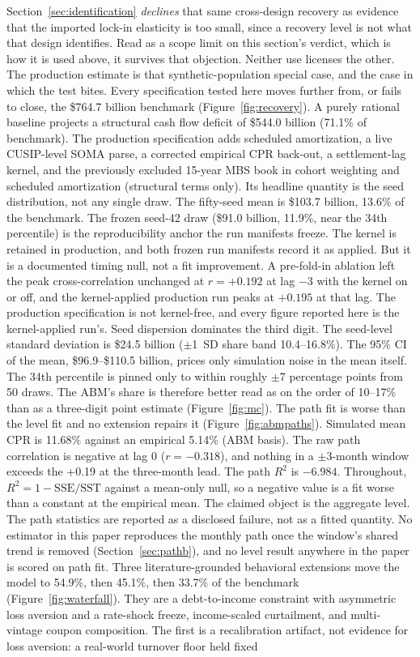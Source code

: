 \documentclass[12pt]{article}
\begin{document}
Section~\ref{sec:identification} \emph{declines} that same cross-design recovery as evidence that the imported lock-in elasticity is too small, since a recovery level is not what that design identifies. Read as a scope limit on this section's verdict, which is how it is used above, it survives that objection. Neither use licenses the other. The production estimate is that synthetic-population special case, and the case in which the test bites. Every specification tested here moves further from, or fails to close, the \$764.7 billion benchmark (Figure~\ref{fig:recovery}). A purely rational baseline projects a structural cash flow deficit of \$544.0 billion (71.1\% of benchmark). The production specification adds scheduled amortization, a live CUSIP-level SOMA parse, a corrected empirical CPR back-out, a settlement-lag kernel, and the previously excluded 15-year MBS book in cohort weighting and scheduled amortization (structural terms only). Its headline quantity is the seed distribution, not any single draw. The fifty-seed mean is \$103.7 billion, 13.6\% of the benchmark. The frozen seed-42 draw (\$91.0 billion, 11.9\%, near the 34th percentile) is the reproducibility anchor the run manifests freeze. The kernel is retained in production, and both frozen run manifests record it as applied. But it is a documented timing null, not a fit improvement. A pre-fold-in ablation left the peak cross-correlation unchanged at $r = +0.192$ at lag $-3$ with the kernel on or off, and the kernel-applied production run peaks at $+0.195$ at that lag. The production specification is not kernel-free, and every figure reported here is the kernel-applied run's. Seed dispersion dominates the third digit. The seed-level standard deviation is \$24.5 billion ($\pm$1~SD share band 10.4--16.8\%). The 95\% CI of the mean, \$96.9--\$110.5 billion, prices only simulation noise in the mean itself. The 34th percentile is pinned only to within roughly $\pm$7 percentage points from 50 draws. The ABM's share is therefore better read as on the order of 10--17\% than as a three-digit point estimate (Figure~\ref{fig:mc}). The path fit is worse than the level fit and no extension repairs it (Figure~\ref{fig:abmpaths}). Simulated mean CPR is 11.68\% against an empirical 5.14\% (ABM basis). The raw path correlation is negative at lag 0 ($r = -0.318$), and nothing in a $\pm$3-month window exceeds the +0.19 at the three-month lead. The path $R^2$ is $-6.984$. Throughout, $R^2 = 1-\mathrm{SSE}/\mathrm{SST}$ against a mean-only null, so a negative value is a fit worse than a constant at the empirical mean. The claimed object is the aggregate level. The path statistics are reported as a disclosed failure, not as a fitted quantity. No estimator in this paper reproduces the monthly path once the window's shared trend is removed (Section~\ref{sec:pathb}), and no level result anywhere in the paper is scored on path fit. Three literature-grounded behavioral extensions move the model to 54.9\%, then 45.1\%, then 33.7\% of the benchmark (Figure~\ref{fig:waterfall}). They are a debt-to-income constraint with asymmetric loss aversion and a rate-shock freeze, income-scaled curtailment, and multi-vintage coupon composition. The first is a recalibration artifact, not evidence for loss aversion: a real-world turnover floor held fixed 
\end{document}
